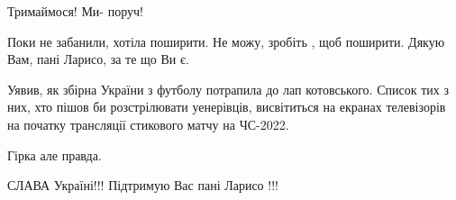 \begin{itemize}
Тримаймося! Ми- поруч!

Поки не забанили, хотіла поширити. Не можу, зробіть , щоб поширити.
Дякую Вам, пані Ларисо, за те що Ви є.


Уявив, як збірна України з футболу потрапила до лап котовського. Список тих з
них, хто пішов би розстрілювати уенерівців, висвітиться на екранах телевізорів
на початку трансляції стикового матчу на ЧС-2022.

Гірка але правда.


СЛАВА Україні!!! Підтримую Вас пані Ларисо !!!


\end{itemize} %
